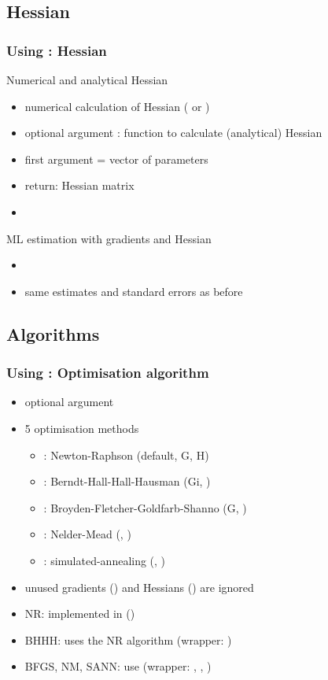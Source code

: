 \documentclass{beamer}
\begin{document}
\subsection{Hessian}
\begin{frame}
\frametitle{Using : Hessian}
Numerical and analytical Hessian
\begin{itemize}
\item numerical calculation of Hessian
   ( or )
\item optional argument :
   function to calculate (analytical) Hessian
\item first argument = vector of parameters
\item return: Hessian matrix
\item {}
\end{itemize}
\vspace*{2ex}
ML estimation with gradients and Hessian
\begin{itemize}
\item {}
\item same estimates and standard errors as before
\end{itemize}
\end{frame}

\subsection{Algorithms}
\begin{frame}
\frametitle{Using : Optimisation algorithm}
\begin{itemize}
\item optional argument 
\item 5 optimisation methods
   \begin{itemize}
   \item {}: Newton-Raphson (default, G, H)
   \item {}: Berndt-Hall-Hall-Hausman (Gi, \noH{})
   \item {}: Broyden-Fletcher-Goldfarb-Shanno (G, \noH{})
   \item {}: Nelder-Mead (\noG{}, \noH{})
   \item {}: simulated-annealing (\noG{}, \noH{})
   \end{itemize}
\item unused gradients (\noG) and Hessians (\noH) are ignored
\item NR: implemented in  ()
\item BHHH: uses the NR algorithm (wrapper: )
\item BFGS, NM, SANN: use 
   (wrapper: , , )
\end{itemize}
\end{frame}
\end{document}
